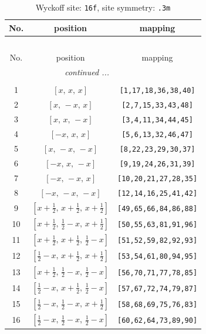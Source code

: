 \documentclass[fleqn,8pt]{jsarticle}
\begin{document}
\begin{longtable}{ccc}
\caption{Wyckoff site: {\tt 16f}, site symmetry: {\tt .3m}}
 \\
 \hline \hline
No. & position & mapping \\ \hline \endfirsthead

\multicolumn{2}{l}{\tablename\ \thetable{}} \\
 \hline \hline
No. & position & mapping \\ \hline \endhead

 \hline \hline
\multicolumn{2}{r}{\footnotesize\it continued ...} \\ \endfoot

 \hline \hline
\multicolumn{2}{r}{} \\ \endlastfoot

1 & $\left[ x,\, x,\, x \right]$ & {\tt [1,17,18,36,38,40]} \\ \hline
2 & $\left[ x,\, - x,\, x \right]$ & {\tt [2,7,15,33,43,48]} \\ \hline
3 & $\left[ x,\, x,\, - x \right]$ & {\tt [3,4,11,34,44,45]} \\ \hline
4 & $\left[ - x,\, x,\, x \right]$ & {\tt [5,6,13,32,46,47]} \\ \hline
5 & $\left[ x,\, - x,\, - x \right]$ & {\tt [8,22,23,29,30,37]} \\ \hline
6 & $\left[ - x,\, x,\, - x \right]$ & {\tt [9,19,24,26,31,39]} \\ \hline
7 & $\left[ - x,\, - x,\, x \right]$ & {\tt [10,20,21,27,28,35]} \\ \hline
8 & $\left[ - x,\, - x,\, - x \right]$ & {\tt [12,14,16,25,41,42]} \\ \hline
9 & $\left[ x + \frac{1}{2},\, x + \frac{1}{2},\, x + \frac{1}{2} \right]$ & {\tt [49,65,66,84,86,88]} \\ \hline
10 & $\left[ x + \frac{1}{2},\, \frac{1}{2} - x,\, x + \frac{1}{2} \right]$ & {\tt [50,55,63,81,91,96]} \\ \hline
11 & $\left[ x + \frac{1}{2},\, x + \frac{1}{2},\, \frac{1}{2} - x \right]$ & {\tt [51,52,59,82,92,93]} \\ \hline
12 & $\left[ \frac{1}{2} - x,\, x + \frac{1}{2},\, x + \frac{1}{2} \right]$ & {\tt [53,54,61,80,94,95]} \\ \hline
13 & $\left[ x + \frac{1}{2},\, \frac{1}{2} - x,\, \frac{1}{2} - x \right]$ & {\tt [56,70,71,77,78,85]} \\ \hline
14 & $\left[ \frac{1}{2} - x,\, x + \frac{1}{2},\, \frac{1}{2} - x \right]$ & {\tt [57,67,72,74,79,87]} \\ \hline
15 & $\left[ \frac{1}{2} - x,\, \frac{1}{2} - x,\, x + \frac{1}{2} \right]$ & {\tt [58,68,69,75,76,83]} \\ \hline
16 & $\left[ \frac{1}{2} - x,\, \frac{1}{2} - x,\, \frac{1}{2} - x \right]$ & {\tt [60,62,64,73,89,90]} \\
\end{longtable}
\end{document}
